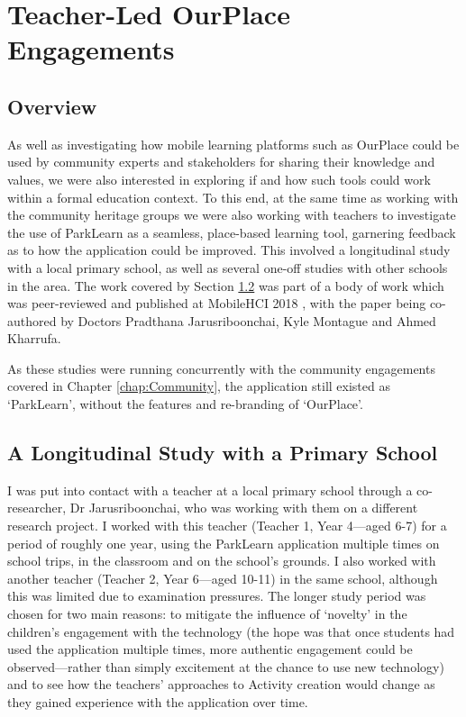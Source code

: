 \chapter{Teacher-Led OurPlace Engagements}
\label{chap:Teachers}

\section{Overview}

As well as investigating how mobile learning platforms such as OurPlace could be used by community experts and stakeholders for sharing their knowledge and values, we were also interested in exploring if and how such tools could work within a formal education context. To this end, at the same time as working with the community heritage groups we were also working with teachers to investigate the use of ParkLearn as a seamless, place-based learning tool, garnering feedback as to how the application could be improved. This involved a longitudinal study with a local primary school, as well as several one-off studies with other schools in the area. The work covered by Section \ref{sec:LongitudinalSchool} was part of a body of work which was peer-reviewed and published at MobileHCI 2018 \citep{Richardson2018}, with the paper being co-authored by Doctors Pradthana Jarusriboonchai, Kyle Montague and Ahmed Kharrufa.

As these studies were running concurrently with the community engagements covered in Chapter \ref{chap:Community}, the application still existed as `ParkLearn', without the features and re-branding of `OurPlace'.

\section{A Longitudinal Study with a Primary School}
\label{sec:LongitudinalSchool}

I was put into contact with a teacher at a local primary school through a co-researcher, Dr Jarusriboonchai, who was working with them on a different research project. I worked with this teacher (Teacher 1, Year 4---aged 6-7) for a period of roughly one year, using the ParkLearn application multiple times on school trips, in the classroom and on the school's grounds. I also worked with another teacher (Teacher 2, Year 6---aged 10-11) in the same school, although this was limited due to examination pressures. The longer study period was chosen for two main reasons: to mitigate the influence of `novelty' in the children’s engagement with the technology (the hope was that once students had used the application multiple times, more authentic engagement could be observed---rather than simply excitement at the chance to use new technology) \citep{Sharples2013} and to see how the teachers' approaches to Activity creation would change as they gained experience with the application over time.

